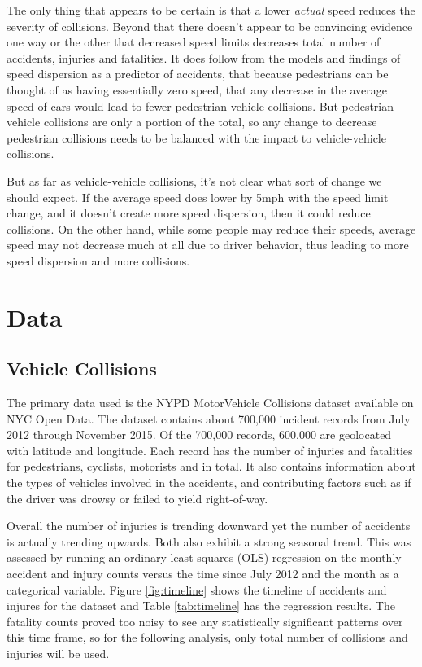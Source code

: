\documentclass[10pt,journal,compsoc]{IEEEtran}
\begin{document}
The only thing that appears to be certain is that a lower \textit{actual} speed reduces the severity of collisions.  Beyond that there doesn't appear to be convincing evidence one way or the other that decreased speed limits decreases total number of accidents, injuries and fatalities.  It does follow from the models and findings of speed dispersion as a predictor of accidents, that because pedestrians can be thought of  as having essentially zero speed, that any decrease in the average speed of cars would lead to fewer pedestrian-vehicle collisions.  But pedestrian-vehicle collisions are only a portion of the total, so any change to decrease pedestrian collisions needs to be balanced with the impact to vehicle-vehicle collisions.

But as far as vehicle-vehicle collisions, it's not clear what sort of change we should expect.  If the average speed does lower by 5mph with the speed limit change, and it doesn't create more speed dispersion, then it could reduce collisions.  On the other hand, while some people may reduce their speeds, average speed may not decrease much at all due to driver behavior, thus leading to more speed dispersion and more collisions.  




\section{Data}

\subsection{Vehicle Collisions}

The primary data used is the NYPD MotorVehicle Collisions dataset available on NYC Open Data\cite{crashdata}.  The dataset contains about 700,000 incident records from July 2012 through November 2015.  Of the 700,000 records, 600,000 are geolocated with latitude and longitude.  Each record has the number of injuries and fatalities for pedestrians, cyclists, motorists and in total.  It also contains information about the types of vehicles involved in the accidents, and contributing factors such as if the driver was drowsy or failed to yield right-of-way.

Overall the number of injuries is trending downward yet the number of accidents is actually trending upwards. Both also exhibit a strong seasonal trend. This was assessed by running an ordinary least squares (OLS) regression on the monthly accident and injury counts versus the time since July 2012 and the month as a categorical variable. Figure \ref{fig:timeline} shows the timeline of accidents and injures for the dataset and Table \ref{tab:timeline} has the regression results. The fatality counts proved too noisy to see any statistically significant patterns over this time frame, so for the following analysis, only total number of collisions and injuries will be used.
\end{document}
